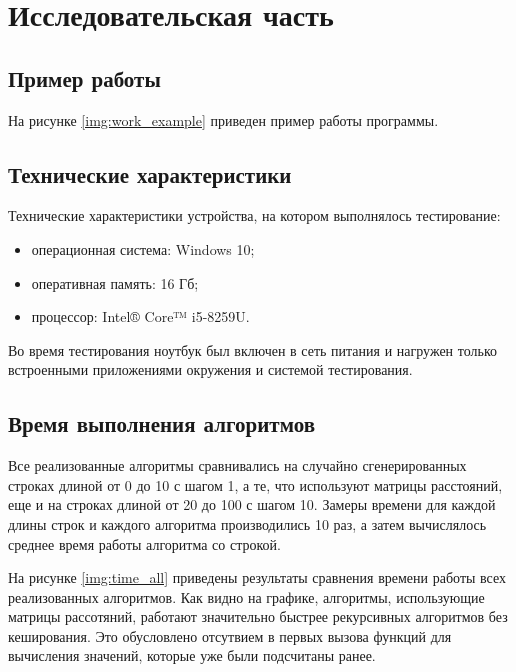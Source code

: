 \chapter{Исследовательская часть}

\section{Пример работы}

На рисунке \ref{img:work_example} приведен пример работы программы.


\section{Технические характеристики}

Технические характеристики устройства, на котором выполнялось тестирование:

\begin{itemize}
	\item операционная система: Windows 10;
	\item оперативная память: 16 Гб;
	\item процессор: Intel® Core™ i5-8259U.
\end{itemize}

Во время тестирования ноутбук был включен в сеть питания и нагружен только встроенными приложениями окружения и системой тестирования.

\section{Время выполнения алгоритмов}

 Все реализованные алгоритмы сравнивались на случайно сгенерированных строках длиной от 0 до 10 с шагом 1, а те, что используют матрицы расстояний, еще и на строках длиной от 20 до 100 с шагом 10. Замеры времени для каждой длины строк и каждого алгоритма производились 10 раз, а затем вычислялось среднее время работы алгоритма со строкой.
 
На рисунке \ref{img:time_all} приведены результаты сравнения времени работы всех реализованных алгоритмов. Как видно на графике, алгоритмы, использующие матрицы рассотяний, работают значительно быстрее рекурсивных алгоритмов без кеширования. Это обусловлено отсутвием в первых вызова функций для вычисления значений, которые уже были подсчитаны ранее.


